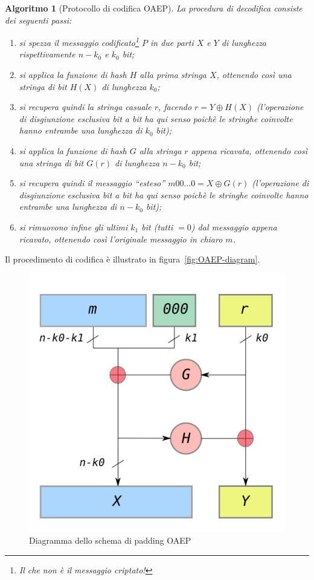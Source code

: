 \documentclass[pdflatex,11pt,a4paper,oneside]{article}
\let\OldEmph\emph
\renewcommand{\emph}[1]{\OldEmph{#1\/}}
\newtheorem{algorithm}[TheoremLike]{Algoritmo}
\begin{document}
\begin{algorithm}[Protocollo di codifica OAEP]
\medskip\noindent
La procedura di decodifica consiste dei seguenti passi:
\begin{enumerate}
\item
  si spezza il messaggio codificato\footnote{Il che \emph{non} \`e il
  messaggio criptato!} $P$ in due parti $X$ e $Y$ di lunghezza
  rispettivamente $n - k_0$ e $k_0$ bit;
\item
  si applica la funzione di hash $H$ alla prima stringa $X$,
  ottenendo cos\`i una stringa di bit $H(X)$ di lunghezza $k_0$;
\item
  si recupera quindi la stringa casuale $r$, facendo $r = Y \oplus H(X)$
  (l'operazione di disgiunzione esclusiva bit a bit ha qui senso poich\`e
  le stringhe coinvolte hanno entrambe una lunghezza di $k_0$ bit);
\item
  si applica la funzione di hash $G$ alla stringa $r$ appena ricavata,
  ottenendo cos\`i una stringa di bit $G(r)$ di lunghezza $n - k_0$ bit;
\item
  si recupera quindi il messaggio ``esteso'' $m00\ldots0 = X \oplus G(r)$
  (l'operazione di disgiunzione esclusiva bit a bit ha qui senso poich\`e
  le stringhe coinvolte hanno entrambe una lunghezza di $n - k_0$ bit);
\item
  si rimuovono infine gli ultimi $k_1$ bit (tutti $= 0$) dal messaggio
  appena ricavato, ottenendo cos\`i l'originale messaggio in chiaro $m$.
\end{enumerate}
\end{algorithm}

\noindent
Il procedimento di codifica \`e illustrato in
figura~\eqref{fig:OAEP-diagram}.
\vspace*{-10pt}
\begin{figure}[!h]
  \centering
    \includegraphics[scale=0.5]{OAEP-diagram}
    \caption{Diagramma dello schema di padding OAEP}
    \label{fig:OAEP-diagram}
\end{figure}
\end{document}
